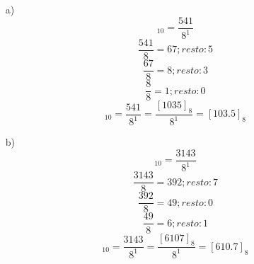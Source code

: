 \documentclass{article}
\begin{document}
\begin{enumerate}
\item[a)] \begin{equation*}[67.625]_{10} = \frac{541}{8^{1}}\end{equation*}\begin{equation*} \frac{541}{8} =  67;  resto: 5\end{equation*}\begin{equation*} \frac{67}{8} =  8;  resto: 3\end{equation*}\begin{equation*} \frac{8}{8} =  1;  resto: 0\end{equation*}\begin{equation*}[67.625]_{10} = \frac{541}{8^{1}} = \frac{[1035]_{8}}{8^{1}} = [103.5]_{8}\end{equation*}
\item[b)] \begin{equation*}[392.875]_{10} = \frac{3143}{8^{1}}\end{equation*}\begin{equation*} \frac{3143}{8} =  392;  resto: 7\end{equation*}\begin{equation*} \frac{392}{8} =  49;  resto: 0\end{equation*}\begin{equation*} \frac{49}{8} =  6;  resto: 1\end{equation*}\begin{equation*}[392.875]_{10} = \frac{3143}{8^{1}} = \frac{[6107]_{8}}{8^{1}} = [610.7]_8\end{equation*}

\end{enumerate}
\end{document}
